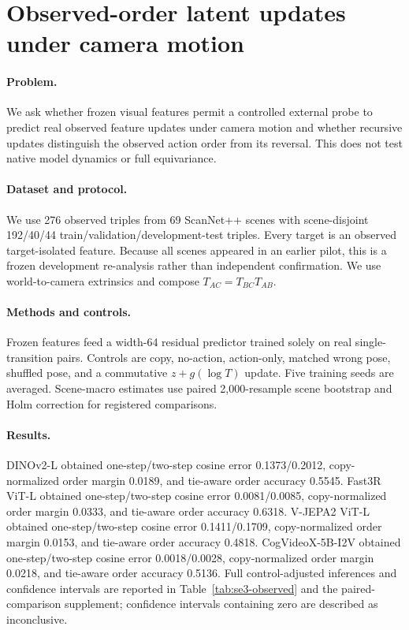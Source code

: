 \section{Observed-order latent updates under camera motion}
\paragraph{Problem.} We ask whether frozen visual features permit a controlled external probe to predict real observed feature updates under camera motion and whether recursive updates distinguish the observed action order from its reversal. This does not test native model dynamics or full equivariance.

\paragraph{Dataset and protocol.} We use 276 observed triples from 69 ScanNet++ scenes with scene-disjoint 192/40/44 train/validation/development-test triples. Every target is an observed target-isolated feature. Because all scenes appeared in an earlier pilot, this is a frozen development re-analysis rather than independent confirmation. We use world-to-camera extrinsics and compose $T_{AC}=T_{BC}T_{AB}$.

\paragraph{Methods and controls.} Frozen features feed a width-64 residual predictor trained solely on real single-transition pairs. Controls are copy, no-action, action-only, matched wrong pose, shuffled pose, and a commutative $z+g(\log T)$ update. Five training seeds are averaged. Scene-macro estimates use paired 2,000-resample scene bootstrap and Holm correction for registered comparisons.

\paragraph{Results.} DINOv2-L obtained one-step/two-step cosine error 0.1373/0.2012, copy-normalized order margin 0.0189, and tie-aware order accuracy 0.5545. Fast3R ViT-L obtained one-step/two-step cosine error 0.0081/0.0085, copy-normalized order margin 0.0333, and tie-aware order accuracy 0.6318. V-JEPA2 ViT-L obtained one-step/two-step cosine error 0.1411/0.1709, copy-normalized order margin 0.0153, and tie-aware order accuracy 0.4818. CogVideoX-5B-I2V obtained one-step/two-step cosine error 0.0018/0.0028, copy-normalized order margin 0.0218, and tie-aware order accuracy 0.5136. Full control-adjusted inferences and confidence intervals are reported in Table~\ref{tab:se3-observed} and the paired-comparison supplement; confidence intervals containing zero are described as inconclusive.

